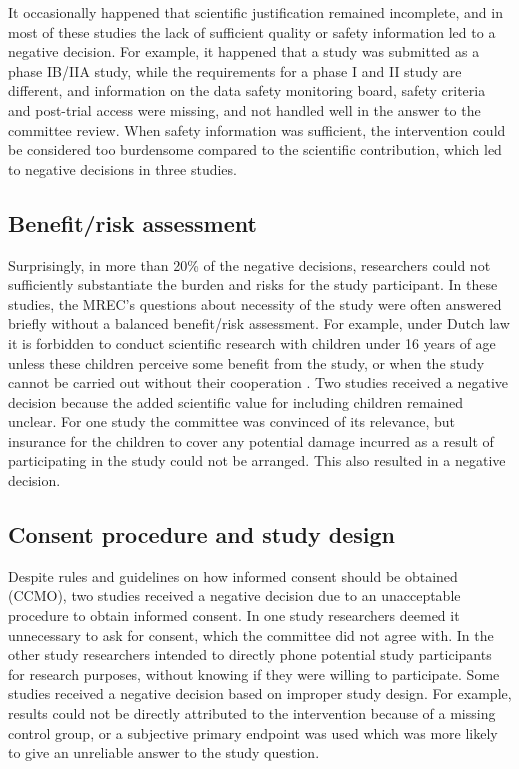 \documentclass[authordate, meta]{jote-new-article}
\begin{document}
It occasionally happened that scientific justification remained incomplete, and in most of these studies the lack of sufficient quality or safety information led to a negative decision. For example, it happened that a study was submitted as a phase IB/IIA study, while the requirements for a phase I and II study are different, and information on the data safety monitoring board, safety criteria and post-trial access were missing, and not handled well in the answer to the committee review. When safety information was sufficient, the intervention could be considered too burdensome compared to the scientific contribution, which led to negative decisions in three studies.







\subsection{Benefit/risk assessment}



Surprisingly, in more than 20\% of the negative decisions, researchers could not sufficiently substantiate the burden and risks for the study participant. In these studies, the MREC's questions about necessity of the study were often answered briefly without a balanced benefit/risk assessment. For example, under Dutch law it is forbidden to conduct scientific research with children under 16 years of age unless these children perceive some benefit from the study, or when the study cannot be carried out without their cooperation \parencites{NederlandseOverheid2022}. Two studies received a negative decision because the added scientific value for including children remained unclear. For one study the committee was convinced of its relevance, but insurance for the children to cover any potential damage incurred as a result of participating in the study could not be arranged. This also resulted in a negative decision.







\subsection{Consent procedure and study design}



Despite rules and guidelines on how informed consent should be obtained (CCMO), two studies received a negative decision due to an unacceptable procedure to obtain informed consent. In one study researchers deemed it unnecessary to ask for consent, which the committee did not agree with. In the other study researchers intended to directly phone potential study participants for research purposes, without knowing if they were willing to participate. Some studies received a negative decision based on improper study design. For example, results could not be directly attributed to the intervention because of a missing control group, or a subjective primary endpoint was used which was more likely to give an unreliable answer to the study question.
\end{document}
